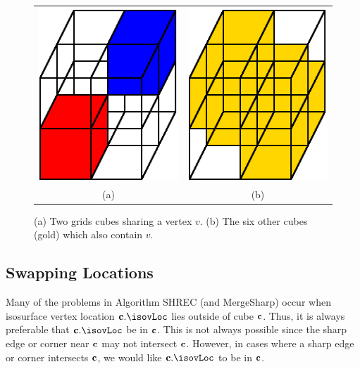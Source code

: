 \begin{figure}[t]
\centering

\begin{tabular}{cc}
\includegraphics[width=0.4\linewidth]{images/shared_vertex.eps} \qquad &
\qquad
\includegraphics[width=0.4\linewidth]{images/shared_vertex_B.eps} \\
(a) & (b)
\end{tabular}

\caption{(a) Two grids cubes sharing a vertex $v$.
(b) The six other cubes (gold) which also contain $v$.
}
\label{fig:shared_vertex}
\end{figure}

\subsection{Swapping Locations}

Many of the problems in Algorithm SHREC (and MergeSharp) occur when
isosurface vertex location $\cb.\isovLoc$ lies outside of cube $\mathbf{c}$.
Thus, it is always preferable that $\cb.\isovLoc$ be in $\mathbf{c}$.
This is not always possible since the sharp edge or corner near $\mathbf{c}$
may not intersect $\mathbf{c}$.
However, in cases where a sharp edge or corner intersects $\mathbf{c}$,
we would like $\cb.\isovLoc$ to be in $\mathbf{c}$.

